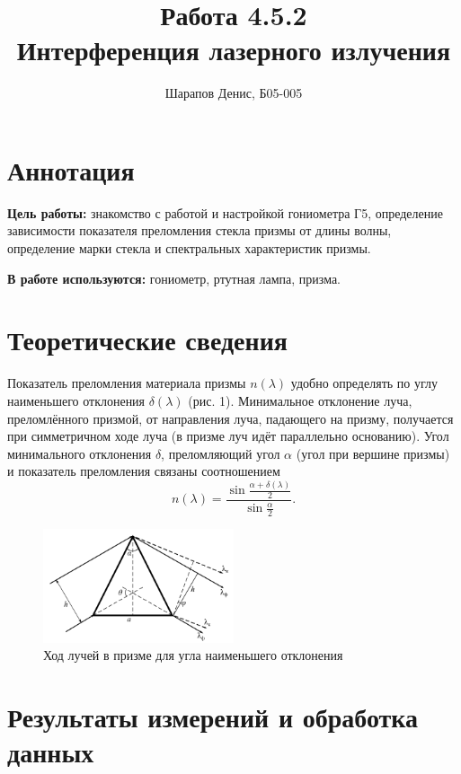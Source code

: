 \documentclass[a4paper]{article}
\title{Работа 4.5.2 \\ Интерференция лазерного излучения}
\author{Шарапов Денис, Б05-005}
\date{}
\begin{document}
    \maketitle
    \tableofcontents
    \newpage
    
\section{Аннотация}

\noindent\textbf{Цель работы:} знакомство с работой и настройкой гониометра Г5, определение зависимости показателя преломления стекла призмы от длины волны, определение марки стекла и спектральных характеристик призмы. \smallskip
 
\noindent \textbf{В работе используются:} гониометр, ртутная лампа, призма.

\section{Теоретические сведения}

Показатель преломления материала призмы $n(\lambda)$ удобно определять
по углу наименьшего отклонения $\delta(\lambda)$ (рис. 1). Минимальное отклонение луча, преломлённого призмой, от направления луча, падающего
на призму, получается при симметричном ходе луча (в призме луч идёт
параллельно основанию). Угол минимального отклонения $\delta$, преломляющий угол $\alpha$ (угол при вершине призмы) и показатель преломления
связаны соотношением $$n(\lambda) = \frac{\sin{\frac{\alpha + \delta(\lambda)}{2}}}{\sin{\frac{\alpha}{2}}}.$$

\begin{figure}[ht!]
    \centering
    \includegraphics[width = 0.5\textwidth]{image/pic1.png}
    \caption{Ход лучей в призме для угла наименьшего отклонения}
\end{figure}

\section{Результаты измерений и обработка данных}
\end{document}

